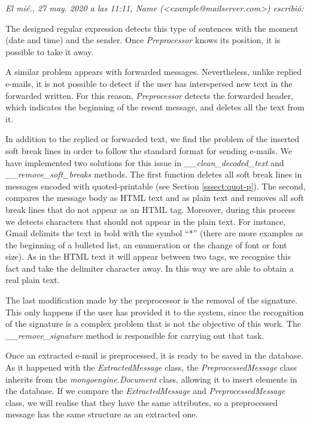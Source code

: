 \textit{El mié., 27 may. 2020 a las 11:11, Name (<example@mailserver.com>) escribió:}

The designed regular expression detects this type of sentences with the moment (date and time) and the sender. Once \textit{Preprocessor} knows its position, it is possible to take it away.

A similar problem appears with forwarded messages. Nevertheless, unlike replied e-mails, it is not possible to detect if the user has interspersed new text in the forwarded written. For this reason, \textit{Preprocessor} detects the forwarded header, which indicates the beginning of the resent message, and deletes all the text from it.

In addition to the replied or forwarded text, we find the problem of the inserted soft break lines in order to follow the standard format for sending e-mails. We have implemented two solutions for this issue in \textit{\_\_clean\_decoded\_text} and \textit{\_\_remove\_soft\_breaks} methods. The first function deletes all soft break lines in messages encoded with quoted-printable (see Section \ref{sssect:quot-p}). The second, compares the message body as HTML text and as plain text and removes all soft break lines that do not appear as an HTML tag. Moreover, during this process we detects characters that should not appear in the plain text. For instance, Gmail delimits the text in bold with the symbol ``*'' (there are more examples as the beginning of a bulleted list, an enumeration or the change of font or font size). As in the HTML text it will appear between two tags, we recognise this fact and take the delimiter character away. In this way we are able to obtain a real plain text.

The last modification made by the preprocessor is the removal of the signature. This only happens if the user has provided it to the system, since the recognition of the signature is a complex problem that is not the objective of this work. The \textit{\_\_remove\_signature} method is responsible for carrying out that task.

Once an extracted e-mail is preprocessed, it is ready to be saved in the database. As it happened with the \textit{ExtractedMessage} class, the \textit{PreprocessedMessage} class inherits from the \textit{mongoengine.Document} class, allowing it to insert elements in the database. If we compare the \textit{ExtractedMessage} and \textit{PreprocessedMessage} class, we will realise that they have the same attributes, so a preprocessed message has the same structure as an extracted one.